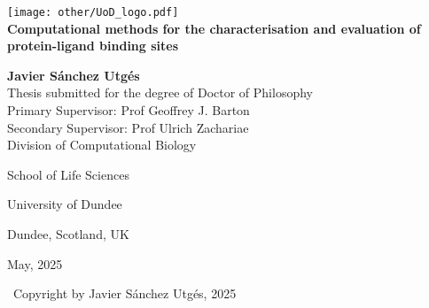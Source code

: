 \begin{titlepage}

	\begin{center}
	
		\texttt{[image: other/UoD\_logo.pdf]}\\[1.5cm]
		
		{\Huge \textbf{Computational methods for the characterisation and evaluation of protein-ligand binding sites}}\\[1.5cm]
		
		{\LARGE \textbf{Javier Sánchez Utgés}}\\[1.5cm]
		
		{\Large Thesis submitted for the degree of Doctor of Philosophy}\\[1.5cm]
		
		{\large Primary Supervisor: Prof Geoffrey J. Barton}\\[0.25cm]

		{\large Secondary Supervisor: Prof Ulrich Zachariae}\\[0.25cm]
		
		
		{\normalsize Division of Computational Biology}
		
		{\normalsize School of Life Sciences}
		
		{\normalsize University of Dundee}
		
		{\normalsize Dundee, Scotland, UK}
		
		{\normalsize May, 2025}
		
		\vfill
		
		{\small \textcopyright\ Copyright by Javier Sánchez Utgés, 2025}

	\end{center}
	
\end{titlepage}
